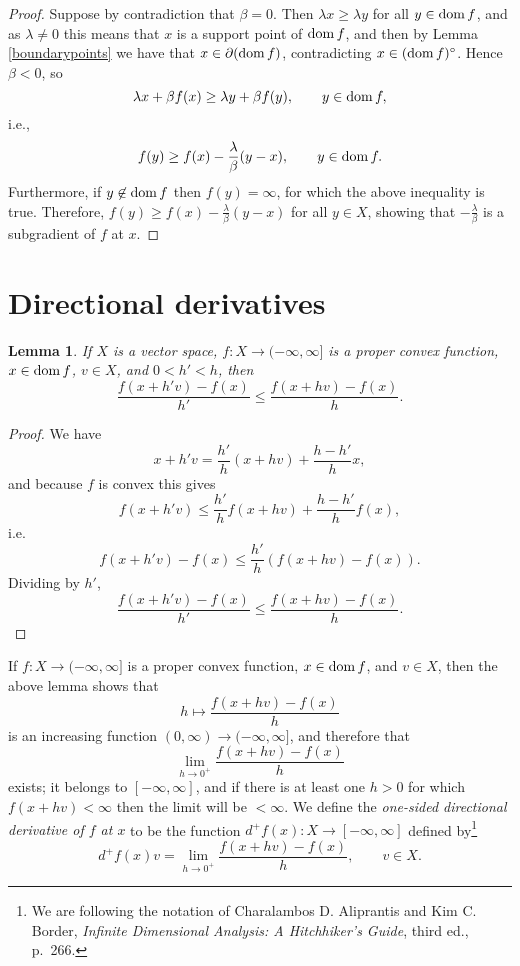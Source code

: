 \documentclass{article}
\newcommand{\dom}{\ensuremath\mathrm{dom}\,}
\newtheorem{lemma}[theorem]{Lemma}
\theoremstyle{definition}
\begin{document}
\begin{proof}
Suppose by contradiction that $\beta =0$. Then $\lambda x \geq \lambda y$ for all $y \in \dom f$, and as $\lambda \neq 0$ this means that $x$ is a support point of $\dom f$, and then
by Lemma \ref{boundarypoints} we have that 
$x \in \partial (\dom f)$, contradicting  $x \in (\dom f)^\circ$. Hence $\beta<0$,  so
\[
\lambda x + \beta f(x) \geq \lambda y + \beta f(y), \qquad  y \in \dom f,
\]
i.e.,
\[
f(y) \geq
f(x) - \frac{\lambda}{\beta}(y-x), \qquad y \in \dom f.
\]
Furthermore, if $y \not \in \dom f$ then  $f(y)=\infty$, for which the above inequality is true. Therefore,
$f(y) \geq f(x) - \frac{\lambda}{\beta}(y-x)$ for all $y \in X$, showing that $-\frac{\lambda}{\beta}$ is a subgradient of $f$ at $x$.
\end{proof}






\section{Directional derivatives}
\begin{lemma}
If $X$ is a vector space, $f:X \to (-\infty,\infty]$ is a proper convex function, $x \in \dom f$, $v \in X$, 
and $0<h'<h$, then
\[
\frac{f(x+h'v)-f(x)}{h'} \leq \frac{f(x+hv)-f(x)}{h}.
\]
\label{directionallemma}
\end{lemma}
\begin{proof}
We have
\[
x+h'v = \frac{h'}{h}(x+hv)+\frac{h-h'}{h}x,
\]
and because $f$ is convex this gives
\[
f(x+h'v) \leq \frac{h'}{h}f(x+hv)+\frac{h-h'}{h}f(x),
\]
i.e.
\[
f(x+h'v)-f(x) \leq \frac{h'}{h}(f(x+hv)-f(x)).
\]
Dividing by $h'$,
\[
\frac{f(x+h'v)-f(x)}{h'} \leq \frac{f(x+hv)-f(x)}{h}.
\]
\end{proof}



If $f:X \to (-\infty,\infty]$ is a proper convex function, $x \in \dom f$, and $v \in X$, then the above lemma shows that 
\[
h \mapsto \frac{f(x+hv)-f(x)}{h} 
\]
is an increasing function $(0,\infty) \to (-\infty,\infty]$, and therefore that 
\[
\lim_{h \to 0^+} \frac{f(x+hv)-f(x)}{h}
\]
exists; it belongs to $[-\infty,\infty]$, and if there is at least one $h>0$ for which $f(x+hv)<\infty$ then the limit will be $<\infty$.
We define the {\em one-sided directional derivative of $f$ at $x$} to be
the function $d^+ f(x):X \to [-\infty,\infty]$ defined by\footnote{We are following the notation of
Charalambos D. Aliprantis and Kim C. Border, {\em Infinite Dimensional Analysis: A Hitchhiker's Guide}, third ed., p.~266.}
\[
d^+f(x)v = \lim_{h \to 0^+} \frac{f(x+h v)-f(x)}{h}, \qquad v \in X.
\]
\end{document}
